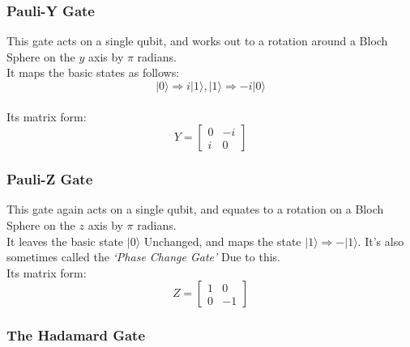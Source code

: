 \documentclass{report}
\begin{document}
\subsubsection{Pauli-Y Gate}

This gate acts on a single qubit, and works out to a rotation around a
Bloch Sphere on the \(y\) axis by \(\pi\) radians.\\
It maps the basic states as follows:\\
\[
\lvert0\rangle \Rightarrow i\lvert1\rangle, \lvert1\rangle \Rightarrow -i\lvert0\rangle\]\\
Its matrix form:\\
\[
Y = \left[ \begin{matrix} 0 & -i\\i & 0\end{matrix} \right]\]

\subsubsection{Pauli-Z Gate}

This gate again acts on a single qubit, and equates to a rotation on a
Bloch Sphere on the \(z\) axis by \(\pi\) radians.\\
It leaves the basic state \(\lvert0\rangle\) Unchanged, and maps the state
\(\lvert1\rangle \Rightarrow -\lvert1\rangle\). It's also sometimes called the
\emph{`Phase Change Gate'} Due to this.\\
Its matrix form:\\
\[
Z = \left[ \begin{matrix} 1 & 0\\0 & -1\end{matrix} \right]\]

\subsubsection{The Hadamard Gate}
\end{document}
